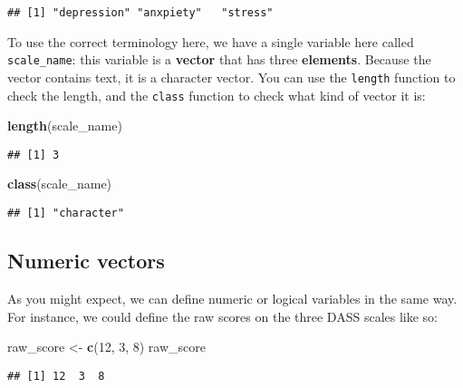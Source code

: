 \documentclass[]{book}
\newenvironment{Shaded}{\begin{snugshade}}{\end{snugshade}}
\newcommand{\DecValTok}[1]{\textcolor[rgb]{0.00,0.00,0.81}{#1}}
\newcommand{\KeywordTok}[1]{\textcolor[rgb]{0.13,0.29,0.53}{\textbf{#1}}}
\newcommand{\NormalTok}[1]{#1}
\newcommand{\StringTok}[1]{\textcolor[rgb]{0.31,0.60,0.02}{#1}}
\begin{document}
\begin{verbatim}
## [1] "depression" "anxpiety"   "stress"
\end{verbatim}

To use the correct terminology here, we have a single variable here called \texttt{scale\_name}: this variable is a \textbf{vector} that has three \textbf{elements}.
Because the vector contains text, it is a character vector. You can use the \texttt{length} function to check the length, and the \texttt{class} function to check what kind of vector it is:

\begin{Shaded}
\begin{Highlighting}[]
\KeywordTok{length}\NormalTok{(scale_name)}
\end{Highlighting}
\end{Shaded}

\begin{verbatim}
## [1] 3
\end{verbatim}

\begin{Shaded}
\begin{Highlighting}[]
\KeywordTok{class}\NormalTok{(scale_name)}
\end{Highlighting}
\end{Shaded}

\begin{verbatim}
## [1] "character"
\end{verbatim}

\hypertarget{numeric-vectors}{%
\subsection{Numeric vectors}\label{numeric-vectors}}

As you might expect, we can define numeric or logical variables in the same way. For instance, we could define the raw scores on the three DASS scales like so:

\begin{Shaded}
\begin{Highlighting}[]
\NormalTok{raw_score <-}\StringTok{ }\KeywordTok{c}\NormalTok{(}\DecValTok{12}\NormalTok{, }\DecValTok{3}\NormalTok{, }\DecValTok{8}\NormalTok{)}
\NormalTok{raw_score}
\end{Highlighting}
\end{Shaded}

\begin{verbatim}
## [1] 12  3  8
\end{verbatim}
\end{document}
